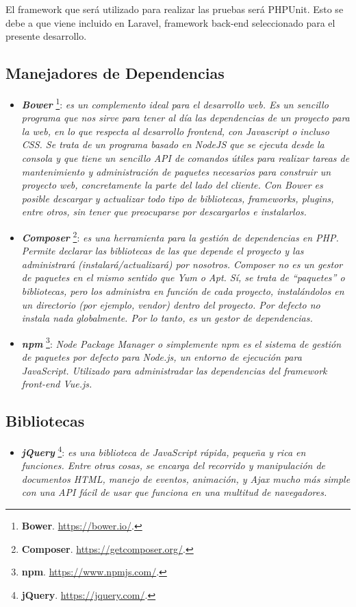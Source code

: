 \documentclass[11pt,oneside]{book}
\begin{document}
El framework que será utilizado para realizar las pruebas será PHPUnit. Esto se debe a que viene incluido en Laravel, framework back-end seleccionado para el presente desarrollo. 

\subsection{Manejadores de Dependencias}
\begin{itemize}
\item \textit{\textbf{Bower}} \footnote{\textbf{Bower}. \url{https://bower.io/}.}: \textit{es un complemento ideal para el desarrollo web. Es un sencillo programa que nos sirve para tener al día las dependencias de un proyecto para la web, en lo que respecta al desarrollo frontend, con Javascript o incluso CSS. Se trata de un programa basado en NodeJS que se ejecuta desde la consola y que tiene un sencillo API de comandos útiles para realizar tareas de mantenimiento y administración de paquetes necesarios para construir un proyecto web, concretamente la parte del lado del cliente. Con Bower es posible descargar y actualizar todo tipo de bibliotecas, frameworks, plugins, entre otros, sin tener que preocuparse por descargarlos e instalarlos.}
\item \textit{\textbf{Composer}} \footnote{\textbf{Composer}. \url{https://getcomposer.org/}.}: \textit{es una herramienta para la gestión de dependencias en PHP. Permite declarar las bibliotecas de las que depende el proyecto y las administrará (instalará/actualizará) por nosotros. Composer no es un gestor de paquetes en el mismo sentido que Yum o Apt. Sí, se trata de ``paquetes'' o bibliotecas, pero los administra en función de cada proyecto, instalándolos en un directorio (por ejemplo, vendor) dentro del proyecto. Por defecto no instala nada globalmente. Por lo tanto, es un gestor de dependencias.}
\item \textit{\textbf{npm}} \footnote{\textbf{npm}. \url{https://www.npmjs.com/}.}: \textit{Node Package Manager o simplemente npm es el sistema de gestión de paquetes por defecto para Node.js, un entorno de ejecución para JavaScript. Utilizado para administradar las dependencias del framework front-end Vue.js.}
\end{itemize}

\newpage
\subsection{Bibliotecas}
\begin{itemize}
\item \textit{\textbf{jQuery}} \footnote{\textbf{jQuery}. \url{https://jquery.com/}.}: \textit{es una biblioteca de JavaScript rápida, pequeña y rica en funciones. Entre otras cosas, se encarga del recorrido y manipulación de documentos HTML, manejo de eventos, animación, y Ajax mucho más simple con una API fácil de usar que funciona en una multitud de navegadores.}
\end{itemize}
\end{document}
